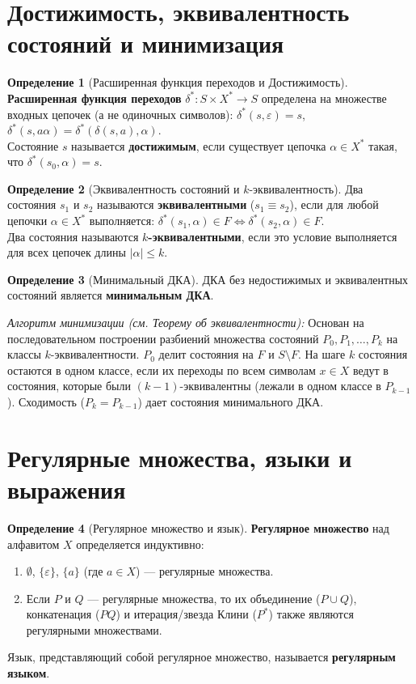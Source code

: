 \documentclass[12pt,a4paper]{article}
\theoremstyle{definition}
\newtheorem{definition}{Определение}
\theoremstyle{plain}
\theoremstyle{remark}
\begin{document}
\section{Достижимость, эквивалентность состояний и минимизация}

\begin{definition}[Расширенная функция переходов и Достижимость]
\textbf{Расширенная функция переходов} $\delta^*: S \times X^* \to S$ определена на множестве входных цепочек (а не одиночных символов): $\delta^*(s, \varepsilon) = s$, $\delta^*(s, a\alpha) = \delta^*(\delta(s, a), \alpha)$. \\
Состояние $s$ называется \textbf{достижимым}, если существует цепочка $\alpha \in X^*$ такая, что $\delta^*(s_0, \alpha) = s$.
\end{definition}

\begin{definition}[Эквивалентность состояний и $k$-эквивалентность]
Два состояния $s_1$ и $s_2$ называются \textbf{эквивалентными} ($s_1 \equiv s_2$), если для любой цепочки $\alpha \in X^*$ выполняется: $\delta^*(s_1, \alpha) \in F \iff \delta^*(s_2, \alpha) \in F$. \\
Два состояния называются \textbf{$k$-эквивалентными}, если это условие выполняется для всех цепочек длины $|\alpha| \le k$.
\end{definition}

\begin{definition}[Минимальный ДКА]
ДКА без недостижимых и эквивалентных состояний является \textbf{минимальным ДКА}.
\end{definition}

\textit{Алгоритм минимизации (см. Теорему об эквивалентности):}
Основан на последовательном построении разбиений множества состояний $P_0, P_1, \dots, P_k$ на классы $k$-эквивалентности. $P_0$ делит состояния на $F$ и $S \setminus F$. На шаге $k$ состояния остаются в одном классе, если их переходы по всем символам $x \in X$ ведут в состояния, которые были $(k-1)$-эквивалентны (лежали в одном классе в $P_{k-1}$). Сходимость ($P_k = P_{k-1}$) дает состояния минимального ДКА.

\section{Регулярные множества, языки и выражения}

\begin{definition}[Регулярное множество и язык]
\textbf{Регулярное множество} над алфавитом $X$ определяется индуктивно:
\begin{enumerate}
    \item $\emptyset$, $\{\varepsilon\}$, $\{a\}$ (где $a \in X$) — регулярные множества.
    \item Если $P$ и $Q$ — регулярные множества, то их объединение ($P \cup Q$), конкатенация ($PQ$) и итерация/звезда Клини ($P^*$) также являются регулярными множествами.
\end{enumerate}
Язык, представляющий собой регулярное множество, называется \textbf{регулярным языком}.
\end{definition}
\end{document}
